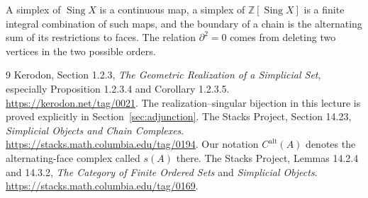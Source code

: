 \documentclass[11pt]{article}
\newcommand{\coursebold}[1]{{\color{burgundy}\textbf{#1}}}
\newcommand{\Z}{\mathbb Z}
\newcommand{\Sing}{\operatorname{Sing}}
\newcommand{\C}{C^{\mathrm{alt}}}
\begin{document}
\medskip
\noindent\coursebold{Closing Check.}
A simplex of $\Sing X$ is a continuous map, a simplex of $\Z[\Sing X]$ is a finite integral combination of such maps, and the boundary of a chain is the alternating sum of its restrictions to faces. The relation $\partial^2=0$ comes from deleting two vertices in the two possible orders.

\begin{thebibliography}{9}
Kerodon, Section 1.2.3, \emph{The Geometric Realization of a Simplicial Set}, especially Proposition 1.2.3.4 and Corollary 1.2.3.5.
\url{https://kerodon.net/tag/0021}.
The realization--singular bijection in this lecture is proved explicitly in Section~\ref{sec:adjunction}.
The Stacks Project, Section 14.23, \emph{Simplicial Objects and Chain Complexes}.
\url{https://stacks.math.columbia.edu/tag/0194}.
Our notation $\C(A)$ denotes the alternating-face complex called $s(A)$ there.
The Stacks Project, Lemmas 14.2.4 and 14.3.2, \emph{The Category of Finite Ordered Sets} and \emph{Simplicial Objects}.
\url{https://stacks.math.columbia.edu/tag/0169}.
\end{thebibliography}
\end{document}
